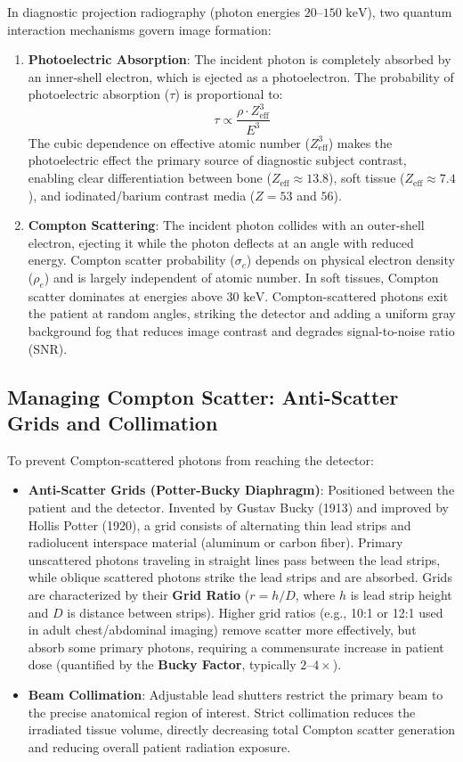 \documentclass[11pt,a4paper]{article}
\begin{document}
In diagnostic projection radiography (photon energies $20\text{--}150\text{ keV}$), two quantum interaction mechanisms govern image formation:
\begin{enumerate}
    \item \textbf{Photoelectric Absorption}: The incident photon is completely absorbed by an inner-shell electron, which is ejected as a photoelectron. The probability of photoelectric absorption ($\tau$) is proportional to:
    \begin{equation}
        \tau \propto \frac{\rho \cdot Z_{\text{eff}}^3}{E^3}
    \end{equation}
    The cubic dependence on effective atomic number ($Z_{\text{eff}}^3$) makes the photoelectric effect the primary source of diagnostic subject contrast, enabling clear differentiation between bone ($Z_{\text{eff}} \approx 13.8$), soft tissue ($Z_{\text{eff}} \approx 7.4$), and iodinated/barium contrast media ($Z = 53$ and $56$).
    \item \textbf{Compton Scattering}: The incident photon collides with an outer-shell electron, ejecting it while the photon deflects at an angle with reduced energy. Compton scatter probability ($\sigma_c$) depends on physical electron density ($\rho_e$) and is largely independent of atomic number. In soft tissues, Compton scatter dominates at energies above $30\text{ keV}$. Compton-scattered photons exit the patient at random angles, striking the detector and adding a uniform gray background fog that reduces image contrast and degrades signal-to-noise ratio (SNR).
\end{enumerate}

\subsection{Managing Compton Scatter: Anti-Scatter Grids and Collimation}
To prevent Compton-scattered photons from reaching the detector:
\begin{itemize}[leftmargin=*]
    \item \textbf{Anti-Scatter Grids (Potter-Bucky Diaphragm)}: Positioned between the patient and the detector. Invented by Gustav Bucky (1913) and improved by Hollis Potter (1920), a grid consists of alternating thin lead strips and radiolucent interspace material (aluminum or carbon fiber). Primary unscattered photons traveling in straight lines pass between the lead strips, while oblique scattered photons strike the lead strips and are absorbed. Grids are characterized by their \textbf{Grid Ratio} ($r = h/D$, where $h$ is lead strip height and $D$ is distance between strips). Higher grid ratios (e.g., 10:1 or 12:1 used in adult chest/abdominal imaging) remove scatter more effectively, but absorb some primary photons, requiring a commensurate increase in patient dose (quantified by the \textbf{Bucky Factor}, typically $2\text{--}4\times$).
    \item \textbf{Beam Collimation}: Adjustable lead shutters restrict the primary beam to the precise anatomical region of interest. Strict collimation reduces the irradiated tissue volume, directly decreasing total Compton scatter generation and reducing overall patient radiation exposure.
\end{itemize}
\end{document}
